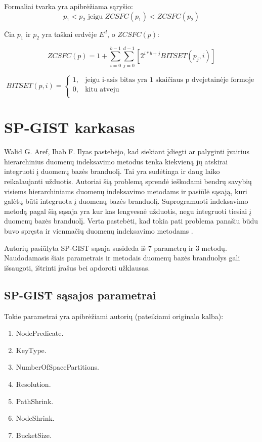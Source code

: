Formaliai tvarka yra apibrėžiama sąryšio:
\begin{equation}
	p_1 < p_2 \text{ jeigu } ZCSFC(p_1) < ZCSFC(p_2)
\label{eq:ZCurveSFCComparison}
\end{equation}

Čia $p_1$ ir $p_2$ yra taškai erdvėje $E^d$, o $ZCSFC(p)$:

\begin{equation}
	ZCSFC(p) = 1 + \sum_{i=0}^{b-1} \sum_{j=0}^{d-1} [2^{i*b+j} BITSET(p_j, i)]
\label{eq:ZCurveSFCValue}
\end{equation}


\begin{equation}
	BITSET(p, i)=
\begin{cases}
	1,& \text{jeigu } \text{i-asis bitas yra 1 skaičiaus p dvejetainėje formoje}\\
	0,& \text{kitu atveju}\\
\end{cases}
\label{eq:Bitset}
\end{equation}






\section{SP-GIST karkasas}

Walid G. Aref, Ihab F. Ilyas \cite{aref2001sp} pastebėjo, kad siekiant įdiegti ar palyginti įvairius hierarchinius duomenų indeksavimo metodus tenka kiekvieną jų atskirai integruoti į duomenų bazės branduolį.
Tai yra sudėtinga ir daug laiko reikalaujanti užduotis.
Autoriai šią problemą sprendė ieškodami bendrų savybių visiems hierarchiniams duomenų indeksavimo metodams ir pasiūlė sąsają, kuri galėtų būti integruota į duomenų bazės branduolį.
Suprogramuoti indeksavimo metodą pagal šią sąsaja yra kur kas lengvesnė užduotis, negu integruoti tiesiai į duomenų bazės branduolį.
Verta pastebėti, kad tokia pati problema panašiu būdu buvo spręsta ir vienmačių duomenų indeksavimo metodams \cite{hellerstein1995generalized}.

Autorių pasiūlyta SP-GIST sąsaja susideda iš 7 parametrų ir 3 metodų.
Naudodamasis šiais parametrais ir metodais duomenų bazės branduolys gali išsaugoti, ištrinti įrašus bei apdoroti užklausas.

\subsection{SP-GIST sąsajos parametrai}
Tokie parametrai yra apibrėžiami autorių (pateikiami originalo kalba):
\begin{enumerate}
	\item NodePredicate.
	\item KeyType.
	\item NumberOfSpacePartitions.
	\item Resolution.
	\item PathShrink.
	\item NodeShrink.
	\item BucketSize.
\end{enumerate}

